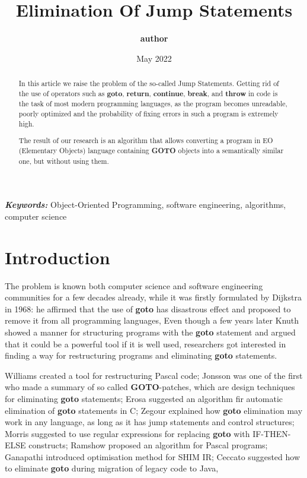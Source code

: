 \documentclass[two column]{article}
\title{\textbf{Elimination Of Jump Statements}}
\author{\textbf{author}}
\date{May 2022}
\providecommand{\keywords}[1]
{
  \small
  \textbf{\textit{Keywords:}} #1
}
\begin{document}
\maketitle

\begin{abstract}
In this article we raise the problem of the so-called Jump Statements. Getting rid of the use of operators such as \textbf{goto}, \textbf{return}, \textbf{continue}, \textbf{break}, and \textbf{throw} in code is the task of most modern programming languages, as the program becomes unreadable, poorly optimized and the probability of fixing errors in such a program is extremely high. 

The result of our research is an algorithm that allows converting a program in EO (Elementary Objects) language containing \textbf{GOTO} objects into a semantically similar one, but without using them.
\end{abstract}

\keywords{Object-Oriented Programming, software engineering, algorithms, computer science}


\section{Introduction}
The problem is known both computer science and software engineering communities for a few decades already, while it was firstly formulated by Dijkstra in 1968: he affirmed that the use of \textbf{goto} has disastrous effect and proposed to remove it from all programming languages, Even though a few years later Knuth showed a manner for structuring programs with the \textbf{goto} statement and argued that it could be a powerful tool if it is well used, researchers got interested in finding a way for restructuring programs and eliminating \textbf{goto} statements.

Williams created a tool for restructuring Pascal code; Jonsson was one of the first who made a summary of so called \textbf{GOTO}-patches, which are design techniques for eliminating \textbf{goto} statements; Erosa suggested an algorithm fir automatic elimination of \textbf{goto} statements in C; Zegour explained how \textbf{goto} elimination may work in any language, as long as it has jump statements and control structures; Morris suggested to use regular expressions for replacing \textbf{goto} with IF-THEN-ELSE constructs; Ramshow proposed an algorithm for Pascal programs; Ganapathi introduced optimisation method for SHIM IR; Ceccato suggested how to eliminate \textbf{goto} during migration of legacy code to Java,
\end{document}
